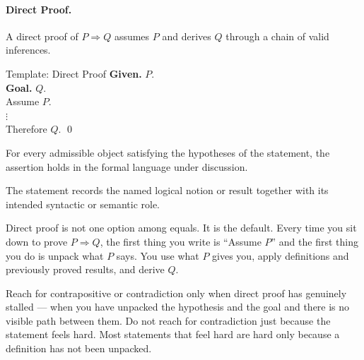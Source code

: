 \paragraph{Direct Proof.}

A direct proof of $P \Rightarrow Q$ assumes $P$ and derives $Q$
through a chain of valid inferences.

\begin{propositionbox}{Template: Direct Proof}
\textbf{Given.} $P$.\\
\textbf{Goal.} $Q$.\\[4pt]
Assume $P$.\\
$\vdots$ \\
Therefore $Q$. \qed
\end{propositionbox}
\begin{remark*}
For every admissible object satisfying the hypotheses of the statement, the
assertion holds in the formal language under discussion.
\end{remark*}

\begin{remark*}[Interpretation]
The statement records the named logical notion or result together with its
intended syntactic or semantic role.
\end{remark*}


\begin{remark}
Direct proof is not one option among equals. It is the default.
Every time you sit down to prove $P \Rightarrow Q$, the first thing you
write is ``Assume $P$'' and the first thing you do is unpack what $P$
says. You use what $P$ gives you, apply definitions and previously proved
results, and derive $Q$.

Reach for contrapositive or contradiction only when direct proof has
genuinely stalled --- when you have unpacked the hypothesis and the goal
and there is no visible path between them. Do not reach for contradiction
just because the statement feels hard. Most statements that feel hard
are hard only because a definition has not been unpacked.
\end{remark}


